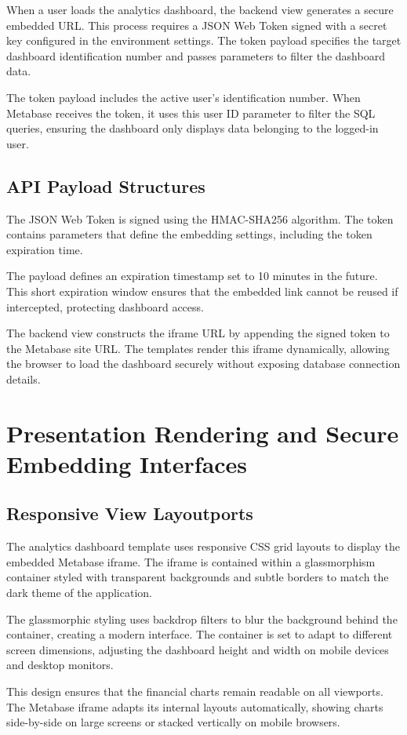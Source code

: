 When a user loads the analytics dashboard, the backend view generates a secure embedded URL. This process requires a JSON Web Token signed with a secret key configured in the environment settings. The token payload specifies the target dashboard identification number and passes parameters to filter the dashboard data.

The token payload includes the active user's identification number. When Metabase receives the token, it uses this user ID parameter to filter the SQL queries, ensuring the dashboard only displays data belonging to the logged-in user.

\subsection{API Payload Structures}
The JSON Web Token is signed using the HMAC-SHA256 algorithm. The token contains parameters that define the embedding settings, including the token expiration time.

The payload defines an expiration timestamp set to 10 minutes in the future. This short expiration window ensures that the embedded link cannot be reused if intercepted, protecting dashboard access.

The backend view constructs the iframe URL by appending the signed token to the Metabase site URL. The templates render this iframe dynamically, allowing the browser to load the dashboard securely without exposing database connection details.

\section{Presentation Rendering and Secure Embedding Interfaces}
\subsection{Responsive View Layoutports}
The analytics dashboard template uses responsive CSS grid layouts to display the embedded Metabase iframe. The iframe is contained within a glassmorphism container styled with transparent backgrounds and subtle borders to match the dark theme of the application.

The glassmorphic styling uses backdrop filters to blur the background behind the container, creating a modern interface. The container is set to adapt to different screen dimensions, adjusting the dashboard height and width on mobile devices and desktop monitors.

This design ensures that the financial charts remain readable on all viewports. The Metabase iframe adapts its internal layouts automatically, showing charts side-by-side on large screens or stacked vertically on mobile browsers.

